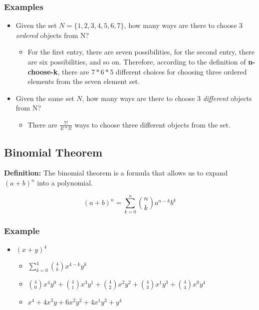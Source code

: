\documentclass{article}
\begin{document}
\subsubsection{Examples}
\begin{itemize}
    \item Given the set $N = \{1, 2, 3, 4, 5, 6, 7\}$, how many ways are there to choose 3 \textit{ordered} objects from N?
    \begin{itemize}
        \item For the first entry, there are seven possibilities, for the second entry, there are six possibilities, and so on. Therefore, according to the definition of \textbf{n-choose-k}, there are $7*6*5$ different choices for choosing three ordered elements from the seven element set.
    \end{itemize}
    \item Given the same set $N$, how many ways are there to choose 3 \textit{different} objects from N?
    \begin{itemize}
        \item There are $\frac{7!}{4!*3!}$ ways to choose three different objects from the set.
    \end{itemize}
\end{itemize}

\subsection{Binomial Theorem}

\textbf{Definition:} The binomial theorem is a formula that allows us to expand $(a+b)^n$ into a polynomial.

$$
(a+b)^n = \sum_{k=0}^n \binom{n}{k}a^{n-k}b^k
$$

\subsubsection{Example}
\begin{itemize}
    \item $(x+y)^4$
    \begin{itemize}
        \item $\sum_{k=0}^4 \binom{4}{k}x^{4-k}y^k$
        \item $\binom{4}{0}x^4y^0 + \binom{4}{1}x^3y^1 + \binom{4}{2}x^2y^2 + \binom{4}{3}x^1y^3 + \binom{4}{4}x^0y^4$
        \item $x^4 + 4x^3y + 6x^2y^2 + 4x^1y^3 + y^4$
    \end{itemize}
\end{itemize}
\end{document}

